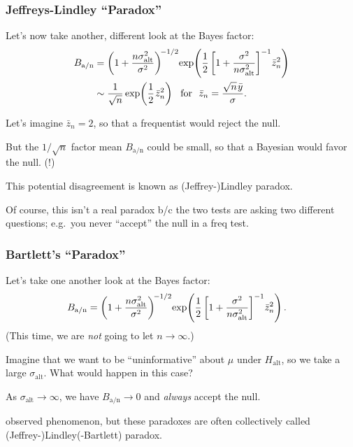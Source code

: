 \documentclass[18pt, handout]{beamer}
\newcommand{\defineTightSpacing}{%
	\setlength{\abovedisplayskip}{.25\baselineskip}%
	\setlength{\belowdisplayskip}{.25\baselineskip}%
}
\newcommand{\thinnerspace}{\mskip.5\thinmuskip}
\newcommand{\hypothesis}{H}
\newcommand{\altSub}{\mathrm{alt}}
\newcommand{\bayesFacAlt}{B_{\mathrm{a} / \mathrm{n}}}
\begin{document}
\begin{frame}
\frametitle{Jeffreys-Lindley ``Paradox''}
Let's now take another, different look at the Bayes factor: 
\begin{equation*} \defineTightSpacing%
\begin{aligned}
\bayesFacAlt
	&= \left( 1 + \frac{n \sigma_\altSub^2}{\sigma^2} \right)^{\!-1/2} \!
	\exp\!\left(
		\frac{1}{2} 
		\left[ 1 + \frac{\sigma^2}{n \sigma_\altSub^2} \right]^{-1} \!
		\bar{z}_n^2
	\right) \\
	&\sim \frac{1}{\sqrt{n}} 
		\exp\!\left(
			\frac{1}{2} \thinnerspace \bar{z}_n^2
		\right)
	\ \text{ for } \
	\bar{z}_n = \frac{\sqrt{n} \thinnerspace \bar{y}}{\sigma}.
\end{aligned}
\end{equation*}

\smallskip
Let's imagine $\bar{z}_n = 2$, so that a frequentist would reject the null.

\smallskip
But the $1 / \sqrt{n}$ factor mean $\bayesFacAlt$ could be small, so that a Bayesian would favor the null. (!)

\smallskip
This potential disagreement is known as (Jeffrey-)Lindley paradox.

Of course, this isn't a real paradox b/c the two tests are asking two different questions; 
e.g.\ you never ``accept'' the null in a freq test.
\end{frame}


\begin{frame}
\frametitle{Bartlett's ``Paradox''}
Let's take one another look at the Bayes factor: 
\begin{equation*} \defineTightSpacing%
\begin{aligned}
\bayesFacAlt
	&= \left( 1 + \frac{n \sigma_\altSub^2}{\sigma^2} \right)^{\!-1/2} \!
	\exp\!\left(
		\frac{1}{2} 
		\left[ 1 + \frac{\sigma^2}{n \sigma_\altSub^2} \right]^{-1} \!
		\bar{z}_n^2
	\right).
\end{aligned}
\end{equation*}
(This time, we are \textit{not} going to let $n \to \infty$.)

\smallskip
Imagine that we want to be ``uninformative'' about $\mu$ under $\hypothesis_\altSub$, so we take a large $\sigma_\altSub$.
What would happen in this case?

\smallskip
As $\sigma_\altSub \to \infty$, we have $\bayesFacAlt \to 0$ and \textit{always} accept the null.

\smallskip
\cite{bartlett1957paradox} observed phenomenon, but these paradoxes are often collectively called (Jeffrey-)Lindley(-Bartlett) paradox.
\end{frame}
\end{document}
